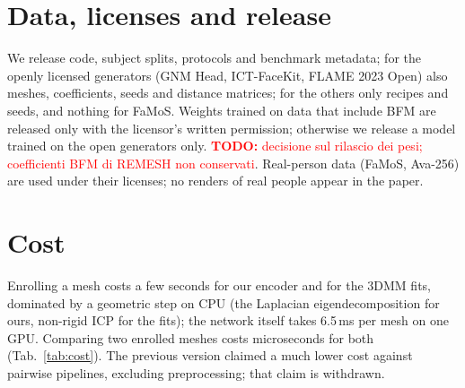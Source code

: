 \documentclass[10pt,twocolumn,letterpaper]{article}
\newcommand{\todo}[1]{\textcolor{red}{\textbf{TODO:} #1}}
\begin{document}
\FloatBarrier
\section{Data, licenses and release}
\label{sec:data}
\begin{table}[h]
  \centering
  \scriptsize
  \caption{Redistribution terms as we read them (not legal advice; to be reviewed before publication).}
  \label{tab:licenses}
  \setlength{\tabcolsep}{2pt}
\end{table}
We release code, subject splits, protocols and benchmark metadata; for the openly licensed generators (GNM Head, ICT-FaceKit, FLAME 2023 Open) also meshes, coefficients, seeds and distance matrices; for the others only recipes and seeds, and nothing for FaMoS. Weights trained on data that include BFM are released only with the licensor's written permission; otherwise we release a model trained on the open generators only. \todo{decisione sul rilascio dei pesi; coefficienti BFM di REMESH non conservati}. Real-person data (FaMoS, Ava-256) are used under their licenses; no renders of real people appear in the paper.

\FloatBarrier
\section{Cost}
\label{sec:cost}
Enrolling a mesh costs a few seconds for our encoder and for the 3DMM fits, dominated by a geometric step on CPU (the Laplacian eigendecomposition for ours, non-rigid ICP for the fits); the network itself takes 6.5\,ms per mesh on one GPU. Comparing two enrolled meshes costs microseconds for both (Tab.~\ref{tab:cost}). The previous version claimed a much lower cost against pairwise pipelines, excluding preprocessing; that claim is withdrawn.
\end{document}

